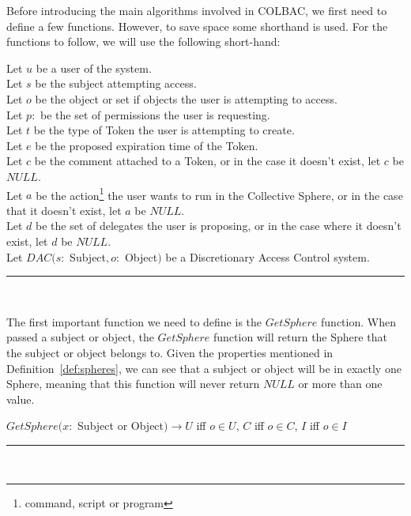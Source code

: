 \noindent Before introducing the main algorithms involved in COLBAC, we first
need to define a few functions. However, to save space some shorthand is used.
For the functions to follow, we will use the following short-hand:

\begin{definition}
Let $u$ be a user of the system.\\
Let $s$ be the subject attempting access.\\
Let $o$ be the object or set if objects the user is attempting to access.\\
Let $p:$ be the set of permissions the user is requesting.\\
Let $t$ be the type of Token the user is attempting to create.\\
Let $e$ be the proposed expiration time of the Token.\\
Let $c$ be the comment attached to a Token, or in the case it doesn't exist,
let $c$ be $NULL$.\\
Let $a$ be the action\footnote{command, script or program} the user wants to run
in the Collective Sphere, or in the case that it doesn't exist, let $a$ be 
$NULL$.\\
Let $d$ be the set of delegates the user is proposing, or in the case where it
doesn't exist, let $d$ be $NULL$.\\
Let $DAC(s :$ Subject$, o:$ Object$)$ be a Discretionary Access Control
system.\\
\hrule \mbox{}\\
\end{definition}

\noindent The first important function we need to define is the $GetSphere$
function. When passed a subject or object, the $GetSphere$ function will return
the Sphere that the subject or object belongs to. Given the properties mentioned
in Definition~\ref{def:spheres}, we can see that a subject or object will be in
exactly one Sphere, meaning that this function will never return $NULL$ or more
than one value.

\begin{definition}[GetSphere]\label{def:getsphere}
$GetSphere(x:$ Subject or Object$) \rightarrow U$ iff $o \in U$, $C$ iff $o \in 
C$, $I$ iff $o \in I$\\
\hrule \mbox{}\\
\end{definition}

